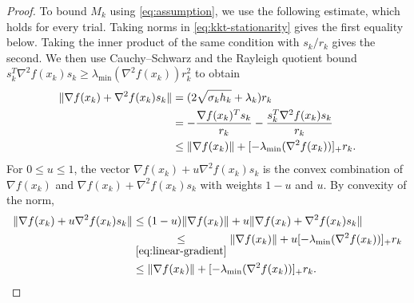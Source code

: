 \begin{proof}
To bound $M_k$ using \eqref{eq:assumption}, we use the following estimate,
which holds for every trial. Taking norms in \eqref{eq:kkt-stationarity}
gives the first equality below.
Taking the inner product of the same condition with $s_k/r_k$ gives the second.
We then use Cauchy--Schwarz and the Rayleigh quotient bound
$s_k^T\nabla^2f(x_k)s_k\ge\lambda_{\min}(\nabla^2 f(x_k))r_k^2$ to obtain
\begin{equation}\label{eq:linear-gradient}
 \begin{aligned}
 \lVert\nabla f(x_k)+\nabla^2f(x_k)s_k\rVert
 &= (2\sqrt{\sigma_kh_k}+\lambda_k)r_k\\
 &= -\frac{\nabla f(x_k)^Ts_k}{r_k}
    -\frac{s_k^T\nabla^2f(x_k)s_k}{r_k}\\
 &\le \lVert\nabla f(x_k)\rVert+[-\lambda_{\min}(\nabla^2f(x_k))]_+r_k.
 \end{aligned}
\end{equation}
For $0\le u\le1$, the vector $\nabla f(x_k)+u\nabla^2f(x_k)s_k$
is the convex combination of $\nabla f(x_k)$ and
$\nabla f(x_k)+\nabla^2f(x_k)s_k$ with weights $1-u$ and $u$.
By convexity of the norm,
\begin{equation}\label{eq:linear-segment}
 \begin{aligned}
 \lVert\nabla f(x_k)+u\nabla^2f(x_k)s_k\rVert
 &\le (1-u)\lVert\nabla f(x_k)\rVert
       +u\lVert\nabla f(x_k)+\nabla^2f(x_k)s_k\rVert\\
 &\underset{\eqref{eq:linear-gradient}}{\le}
       \lVert\nabla f(x_k)\rVert+u[-\lambda_{\min}(\nabla^2f(x_k))]_+r_k\\
 &\le \lVert\nabla f(x_k)\rVert+[-\lambda_{\min}(\nabla^2f(x_k))]_+r_k.
 \end{aligned}
\end{equation}


\end{proof}
